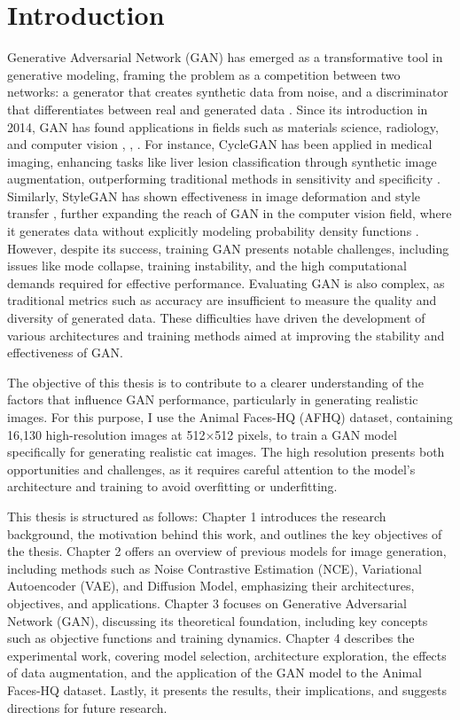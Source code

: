 \chapter{Introduction}

Generative Adversarial Network (GAN) has emerged as a transformative tool in generative modeling, framing the problem as a competition between two networks: a generator that creates synthetic data from noise, and a discriminator that differentiates between real and generated data \citep{10.48550/arxiv.1704.00028}. Since its introduction in 2014, GAN has found applications in fields such as materials science, radiology, and computer vision \citep{10.1002/mgea.30}, \citep{10.1016/j.media.2019.101552}, \citep{10.1016/j.artmed.2020.101938}. For instance, CycleGAN has been applied in medical imaging, enhancing tasks like liver lesion classification through synthetic image augmentation, outperforming traditional methods in sensitivity and specificity \citep{10.1016/j.neucom.2018.09.013}. Similarly, StyleGAN has shown effectiveness in image deformation and style transfer \citep{10.1109/iccv.2019.00453}, further expanding the reach of GAN in the computer vision field, where it generates data without explicitly modeling probability density functions \citep{10.1016/j.media.2019.101552}.
However, despite its success, training GAN presents notable challenges, including issues like mode collapse, training instability, and the high computational demands required for effective performance. Evaluating GAN is also complex, as traditional metrics such as accuracy are insufficient to measure the quality and diversity of generated data. These difficulties have driven the development of various architectures and training methods aimed at improving the stability and effectiveness of GAN.

The objective of this thesis is to contribute to a clearer understanding of the factors that influence GAN performance, particularly in generating realistic images. For this purpose, I use the Animal Faces-HQ (AFHQ) dataset, containing 16,130 high-resolution images at 512×512 pixels, to train a GAN model specifically for generating realistic cat images. The high resolution presents both opportunities and challenges, as it requires careful attention to the model’s architecture and training to avoid overfitting or underfitting.

This thesis is structured as follows: Chapter 1 introduces the research background, the motivation behind this work, and outlines the key objectives of the thesis. Chapter 2 offers an overview of previous models for image generation, including methods such as Noise Contrastive Estimation (NCE), Variational Autoencoder (VAE), and Diffusion Model, emphasizing their architectures, objectives, and applications. Chapter 3 focuses on Generative Adversarial Network (GAN), discussing its theoretical foundation, including key concepts such as objective functions and training dynamics. Chapter 4 describes the experimental work, covering model selection, architecture exploration, the effects of data augmentation, and the application of the GAN model to the Animal Faces-HQ dataset. Lastly, it presents the results, their implications, and suggests directions for future research.